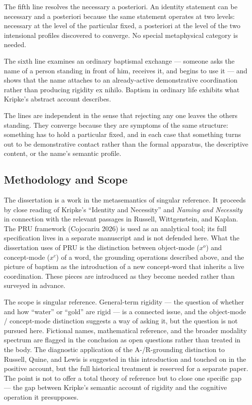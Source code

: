 \documentclass[10pt]{article}
\begin{document}
The fifth line resolves the necessary a posteriori. An identity statement can be necessary and a posteriori because the same statement operates at two levels: necessary at the level of the particular fixed, a posteriori at the level of the two intensional profiles discovered to converge. No special metaphysical category is needed.

The sixth line examines an ordinary baptismal exchange --- someone asks the name of a person standing in front of him, receives it, and begins to use it --- and shows that the name attaches to an already-active demonstrative coordination rather than producing rigidity ex nihilo. Baptism in ordinary life exhibits what Kripke's abstract account describes.

The lines are independent in the sense that rejecting any one leaves the others standing. They converge because they are symptoms of the same structure: something has to hold a particular fixed, and in each case that something turns out to be demonstrative contact rather than the formal apparatus, the descriptive content, or the name's semantic profile.

\subsection{Methodology and Scope}\label{methodology-and-scope}

The dissertation is a work in the metasemantics of singular reference. It proceeds by close reading of Kripke's ``Identity and Necessity'' and \emph{Naming and Necessity} in connection with the relevant passages in Russell, Wittgenstein, and Kaplan. The PRU framework (Cojocariu 2026) is used as an analytical tool; its full specification lives in a separate manuscript and is not defended here. What the dissertation uses of PRU is the distinction between object-mode (\(x^o\)) and concept-mode (\(x^c\)) of a word, the grounding operations described above, and the picture of baptism as the introduction of a new concept-word that inherits a live coordination. These pieces are introduced as they become needed rather than surveyed in advance.

The scope is singular reference. General-term rigidity --- the question of whether and how ``water'' or ``gold'' are rigid --- is a connected issue, and the object-mode / concept-mode distinction suggests a way of asking it, but the question is not pursued here. Fictional names, mathematical reference, and the broader modality spectrum are flagged in the conclusion as open questions rather than treated in the body. The diagnostic application of the A-/R-grounding distinction to Russell, Quine, and Lewis is suggested in this introduction and touched on in the positive account, but the full historical treatment is reserved for a separate paper. The point is not to offer a total theory of reference but to close one specific gap --- the gap between Kripke's semantic account of rigidity and the cognitive operation it presupposes.
\end{document}
